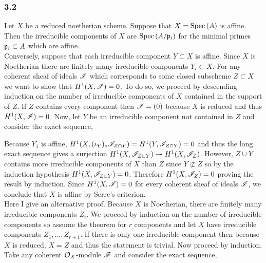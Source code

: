 \documentclass[12pt]{article}
\begin{document}
\subsubsection{3.2}

Let $X$ be a reduced noetherian scheme. Suppose that $X = \mathrm{Spec}\left( A \right)$ is affine. Then the irreducible components of $X$ are $\mathrm{Spec}\left( A/\mathfrak{p}_i \right)$ for the minimal primes $\mathfrak{p}_i \subset A$ which are affine. 
\bigskip\\
Conversely, suppose that each irreducible component $Y \subset X$ is affine. Since $X$ is Noetherian there are finitely many irreducible components $Y_i \subset X$. For any coherent sheaf of ideals $\mathscr{I}$ which corresponds to some closed subscheme $Z \subset X$ we want to show that $H^1(X, \mathscr{I}) = 0$. To do so, we proceed by descending induction on the number of irreducible components of $X$ contained in the support of $Z$. If $Z$ contains every component then $\mathscr{I} = (0)$ because $X$ is reduced and thus $H^1(X, \mathscr{I}) = 0$. Now, let $Y$ be an irreducible component not contained in $Z$ and consider the exact sequence,
\begin{center}
\end{center}
Because $Y_1$ is affine, $H^1(X, (\iota_{Y})_* \mathscr{I}_{Z \cap Y}) = H^1(Y, \mathscr{I}_{Z \cap Y}) = 0$ and thus the long exact sequence gives a surjection $H^1(X, \mathscr{I}_{Z \cup Y}) \twoheadrightarrow H^1(X, \mathscr{I}_Z)$. However, $Z \cup Y$ contains more irreducible components of $X$ than $Z$ since $Y \not\subset Z$ so by the induction hypothesis $H^1(X, \mathscr{I}_{Z \cup Y}) = 0$. Therefore $H^1(X, \mathscr{I}_Z) = 0$ proving the result by induction. Since $H^1(X, \mathscr{I}) = 0$ for every coherent sheaf of ideals $\mathscr{I}$, we conclude that $X$ is affine by Serre's criterion. 
\bigskip\\
Here I give an alternative proof. Because $X$ is Noetherian, there are finitely many irreducible components $Z_i$. We proceed by induction on the number of irreducible components so assume the theorem for $r$ components and let $X$ have irreducible components $Z_1, \dots, Z_{r+1}$. 
If there is only one irreducible component then because $X$ is reduced, $X = Z$ and thus the statement is trivial. Now proceed by induction. Take any coherent $\mathcal{O}_{X}$-module $\mathscr{F}$ and consider the exact sequence,
\begin{center}
\end{center}
\end{document}
